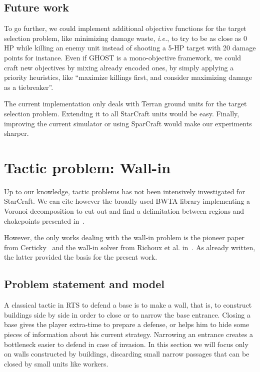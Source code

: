 \documentclass[journal]{IEEEtran}
\newcommand{\ghost}{\textsc{GHOST}\xspace}
\newcommand{\ie}{\textit{i.e.}}
\begin{document}
\subsection{Future work}

To go further,  we could implement additional  objective functions for
the target  selection problem, like  minimizing damage waste,  \ie, to
try to  be as close  as 0  HP while killing  an enemy unit  instead of
shooting a  5-HP target with 20  damage points for instance.   Even if
\ghost is  a mono-objective framework,  we could craft new  objectives by
mixing already encoded ones, by simply applying a priority heuristics,
like ``maximize  killings first, and  consider maximizing damage  as a
tiebreaker''.

The current implementation only deals  with Terran ground units for the
target selection problem.   Extending it to all  StarCraft units would
be easy. Finally,  improving the current simulator  or using SparCraft
would make our experiments sharper.

\section{Tactic problem: Wall-in}\label{sec:wall}

Up  to  our  knowledge,  tactic  problems  has  not  been  intensively
investigated for StarCraft.  We can cite however the broadly used BWTA
library implementing  a Voronoi  decomposition to cut  out and  find a
delimitation    between    regions     and    chokepoints    presented
in~\cite{Perkins10}.

However,  the only  works  dealing  with the  wall-in  problem is  the
pioneer paper  from Certicky~\cite{Certicky13} and the  wall-in solver
from Richoux  et al.   in~\cite{RichouxUO14}. As already  written, the
latter provided the basis for the present work.

\subsection{Problem statement and model}

A classical tactic in RTS to defend a base is to make a wall, that is,
to construct buildings side by side in order to close or to narrow the
base entrance. Closing a base gives the player extra-time to prepare a
defense, or  helps him to  hide some  pieces of information  about his
current strategy. Narrowing an entrance creates a bottleneck easier to
defend in  case of  invasion. In  this section we  will focus  only on
walls constructed by buildings,  discarding small narrow passages that
can be closed by small units like workers.
\end{document}
